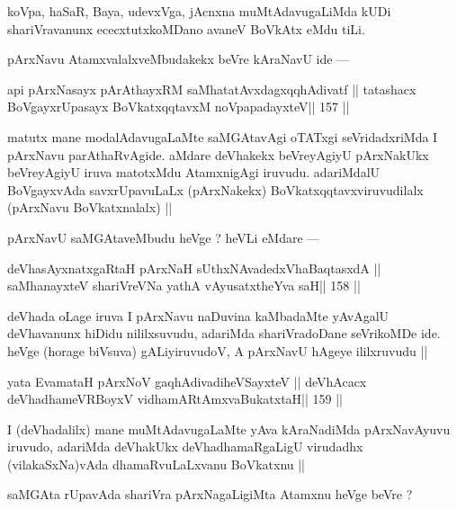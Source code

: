 \begin{artha}
koVpa, haSaR, Baya, udevxVga, jAcnxna muMtAdavugaLiMda kUDi 
shariVravanunx ececxtutxkoMDano avaneV BoVkAtx eMdu tiLi.
\end{artha}

\begin{artha}
pArxNavu AtamxvalalxveMbudakekx beVre kAraNavU ide ---
\end{artha}

\begin{shl}
api pArxNasayx pArAthayxRM saMhatatAvxdagxqqhAdivatf ||
tatashacx BoVgayxrUpasayx BoVkatxqqtavxM noVpapadayxteV\hfill || 157 ||
\end{shl}

\begin{artha}
matutx mane modalAdavugaLaMte saMGAtavAgi oTATxgi seVridadxriMda I 
pArxNavu parAthaRvAgide. aMdare deVhakekx beVreyAgiyU pArxNakUkx 
beVreyAgiyU iruva matotxMdu AtamxnigAgi iruvudu. adariMdalU BoVgayxvAda savxrUpavuLaLx (pArxNakekx) BoVkatxqqtavxviruvudilalx (pArxNavu BoVkatxnalalx) ||
\end{artha}

\begin{artha}
pArxNavU saMGAtaveMbudu heVge ? heVLi eMdare ---
\end{artha}

\begin{shl}
deVhasAyxnatxgaRtaH pArxNaH sUthxNAvadedxVhaBaqtasxdA ||
saMhanayxteV shariVreVNa yathA vAyusatxtheYva saH\hfill || 158 ||
\end{shl}

\begin{artha}
deVhada oLage iruva I pArxNavu naDuvina kaMbadaMte yAvAgalU deVhavanunx 
hiDidu nililxsuvudu, adariMda shariVradoDane seVrikoMDe ide. heVge (horage biVsuva) gALiyiruvudoV, A pArxNavU hAgeye ililxruvudu ||
\end{artha}

\begin{shl}
yata EvamataH pArxNoV gaqhAdivadiheVSayxteV ||
deVhAcacx deVhadhameVRBoyxV vidhamARtAmx\s vaBukatxtaH\hfill || 159 ||
\end{shl}

\begin{artha}
I (deVhadalilx) mane muMtAdavugaLaMte yAva kAraNadiMda pArxNavAyuvu iruvudo, adariMda deVhakUkx deVhadhamaRgaLigU virudadhx (vilakaSxNa)vAda dhamaRvuLaLxvanu BoVkatxnu ||
\end{artha}

\begin{artha}
saMGAta rUpavAda shariVra pArxNagaLigiMta Atamxnu heVge beVre ?
\end{artha}

